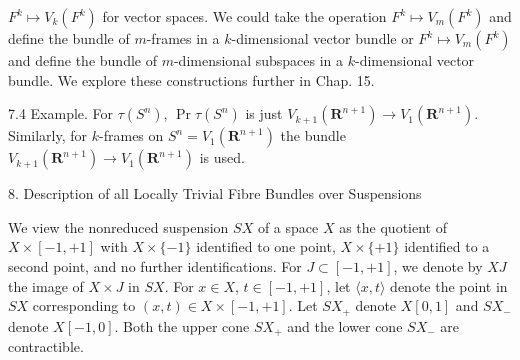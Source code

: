 $F^k \mapsto V_k(F^k)$ for vector spaces. We could take the operation $F^k \mapsto V_m(F^k)$ and define the bundle of $m$-frames in a $k$-dimensional vector bundle or $F^k \mapsto V_m(F^k)$ and define the bundle of $m$-dimensional subspaces in a $k$-dimensional vector bundle. We explore these constructions further in Chap. 15.

7.4 Example. For $\tau(S^n)$, $\Pr \tau(S^n)$ is just $V_{k+1}(\mathbf{R}^{n+1}) \rightarrow V_1(\mathbf{R}^{n+1})$. Similarly, for $k$-frames on $S^n = V_1(\mathbf{R}^{n+1})$ the bundle $V_{k+1}(\mathbf{R}^{n+1}) \rightarrow V_1(\mathbf{R}^{n+1})$ is used.

8. Description of all Locally Trivial Fibre Bundles over Suspensions

We view the nonreduced suspension $SX$ of a space $X$ as the quotient of $X \times [-1, +1]$ with $X \times \{-1\}$ identified to one point, $X \times \{+1\}$ identified to a second point, and no further identifications. For $J \subset [-1, +1]$, we denote by $XJ$ the image of $X \times J$ in $SX$. For $x \in X$, $t \in [-1, +1]$, let $\langle x, t \rangle$ denote the point in $SX$ corresponding to $(x, t) \in X \times [-1, +1]$. Let $SX_+$ denote $X[0, 1]$ and $SX_-$ denote $X[-1, 0]$. Both the upper cone $SX_+$ and the lower cone $SX_-$ are contractible.
